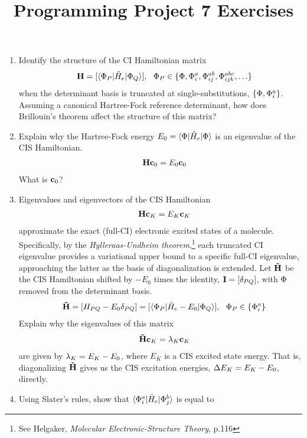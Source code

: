 \documentclass[fleqn,11pt]{article}
\title{Programming Project 7 Exercises}
\author{}
\date{}
\begin{document}
\maketitle

\begin{enumerate}
  \item Identify the structure of the CI Hamiltonian matrix
\begin{align}
&&
  \bo{H}
=
  [\ip{\F_P|\op{H}_e|\F_Q}],
\ \ 
  \F_P\in\{\F,\F_i^a,\F_{ij}^{ab},\F_{ijk}^{abc},\ld\}
\end{align}
  when the determinant basis is truncated at single-substitutions, $\{\Phi,\Phi_i^a\}$.
  Assuming a canonical Hartree-Fock reference determinant, how does Brillouin's theorem affect the structure of this matrix?
  \item Explain why the Hartree-Fock energy $E_0=\langle\Phi|\hat{H}_e|\Phi\rangle$ is an eigenvalue of the CIS Hamiltonian.
\begin{align}
&&
  \mathbf{H}\mathbf{c}_0
=
  E_0\mathbf{c}_0
\end{align}
  What is $\mathbf{c}_0$?
  \item
  Eigenvalues and eigenvectors of the CIS Hamiltonian
\begin{align}
&&
  \mathbf{H}\mathbf{c}_K
=
  E_K\mathbf{c}_K
\end{align}
approximate the exact (full-CI) electronic excited states of a molecule.
  Specifically, by the \textit{Hylleraas-Undheim theorem},\footnote{See Helgaker, \textit{Molecular Electronic-Structure Theory}, p.116} each truncated CI eigenvalue provides a variational upper bound to a specific full-CI eigenvalue, approaching the latter as the basis of diagonalization is extended.
  Let $\mathbf{\tilde{H}}$ be the CIS Hamiltonian shifted by $-E_0$ times the identity, $\mathbf{I}=[\delta_{PQ}]$, with $\Phi$ removed from the determinant basis.
\begin{align}
&&
  \bo{\tl{H}}
=
  [H_{PQ}-E_0\d_{PQ}]
=
  [\ip{\F_P|\op{H}_e-E_0|\F_Q}],
\ \ 
  \F_P\in\{\F_i^a\}
\end{align}
  Explain why the eigenvalues of this matrix
\begin{align}
&&
  \mathbf{\tilde{H}}\mathbf{c}_K
=
  \lambda_K\mathbf{c}_K
\end{align}
are given by $\lambda_K=E_K-E_0$, where $E_K$ is a CIS excited state energy.
  That is, diagonalizing $\mathbf{\tilde{H}}$ gives us the CIS excitation energies, $\Delta E_K=E_K-E_0$, directly.
  \item Using Slater's rules, show that $\langle\Phi_i^a|\hat{H}_e|\Phi_j^b\rangle$ is equal to
  \begin{enumerate}

\end{enumerate}
\end{enumerate}
\end{document}

